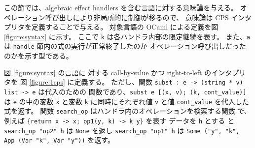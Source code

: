 この節では、algebraic effect handlers を含む言語に対する意味論を与える。
オペレーション呼び出しにより非局所的に制御が移るので、
意味論は CPS インタプリタを定義することで与える。
対象言語の OCaml による定義を図 \ref{figure:syntax} に示す。
ここで \texttt{k} は各ハンドラ内部の限定継続を表す。
また、\texttt{a} は \texttt{handle} 節内の式の実行が正常終了したのか
オペレーション呼び出しだったのかを示す型である。



図 \ref{figure:syntax} の言語に
対する call-by-value かつ right-to-left のインタプリタを
図 \ref{figure:1cps} に定義する。
ただし、関数 \texttt{subst :\ e -> (string * v) list -> e} は代入のための
関数であり、\texttt{subst e [(x, v); (k, cont\_value)]} は \texttt{e}
の中の変数 \texttt{x} と変数 \texttt{k} に同時にそれぞれ値 \texttt{v}
と値 \texttt{cont\_value} を代入した式を返す。
関数 \texttt{search\_op} はハンドラ内のオペレーションを検索する関数
で、例えば \texttt{\{return x -> x; op1(y, k) -> k y\}} を表す
データを \texttt{h} とする
と \texttt{search\_op "op2" h} は \texttt{None} を返し
\texttt{search\_op "op1" h} は \texttt{Some ("y", "k", App (Var "k", Var
"y"))} を返す。

